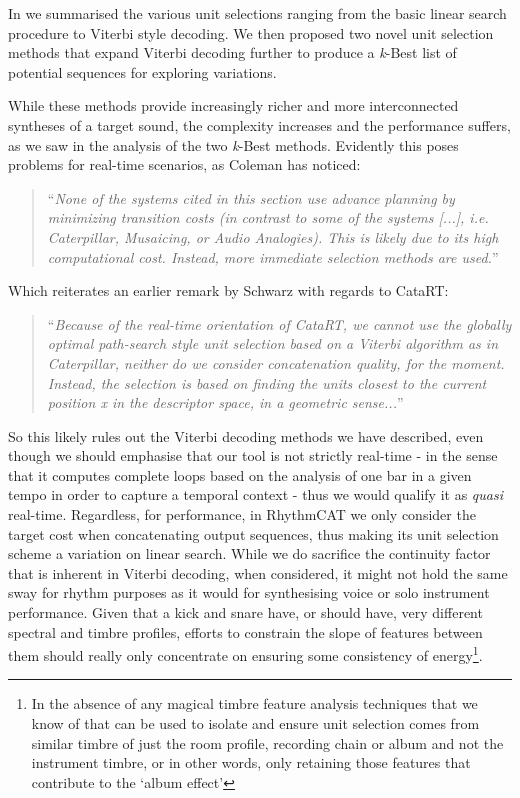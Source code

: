 In  we summarised the various unit selections ranging from the basic linear search procedure to Viterbi style decoding. We then proposed two novel unit selection methods that expand Viterbi decoding further to produce a \textit{k}-Best list of potential sequences for exploring variations.

While these methods provide increasingly richer and more interconnected syntheses of a target sound, the complexity increases and the performance suffers, as we saw in the analysis of the two \textit{k}-Best methods. Evidently this poses problems for real-time scenarios, as  Coleman has noticed:

\blockcquote[]{Coleman2015}{``\textit{None of the systems cited in this section use advance planning by minimizing transition costs (in contrast to some of the systems [...], i.e. Caterpillar, Musaicing, or Audio Analogies). This is likely due to its high computational cost. Instead, more immediate selection methods are used.}''}

Which reiterates an earlier remark by Schwarz with regards to CataRT:

\blockcquote[]{Schwarz2006b}{``\textit{Because of the real-time orientation of CataRT, we cannot use the globally optimal path-search style unit selection based on a Viterbi algorithm as in Caterpillar, neither do we consider concatenation quality, for the moment. Instead, the selection is based on finding the units closest to the current position x in the descriptor space, in a geometric sense...}''}

So this likely rules out the Viterbi decoding methods we have described, even though we should emphasise that our tool is not strictly real-time - in the sense that it computes complete loops based on the analysis of one bar in a given tempo in order to capture a temporal context - thus we would qualify it as \textit{quasi} real-time. Regardless, for performance, in RhythmCAT we only consider the target cost when concatenating output sequences, thus making its unit selection scheme a variation on linear search. While we do sacrifice the continuity factor that is inherent in Viterbi decoding, when considered, it might not hold the same sway for rhythm purposes as it would for synthesising voice or solo instrument performance. Given that a kick and snare have, or should have, very different spectral and timbre profiles, efforts to constrain the slope of features between them should really only concentrate on ensuring some consistency of energy\footnote{In the absence of any magical timbre feature analysis techniques that we know of that can be used to isolate and ensure unit selection comes from similar timbre of just the room profile, recording chain or album and not the instrument timbre, or in other words, only retaining those features that contribute to the `album effect'\citep{mandel2005song, kim2006towards}}.

